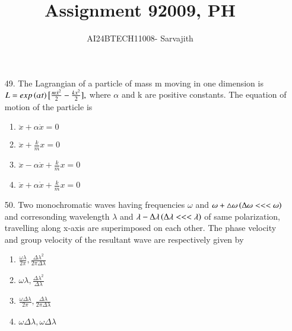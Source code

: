 \documentclass[journal]{IEEEtran}
\begin{document}

\vspace{3cm}


\author{AI24BTECH11008- Sarvajith
}
\title{Assignment 9}
{\let\newpage\relax\maketitle}
\title{2009, PH}
\renewcommand{\thefigure}{\theenumi}
\renewcommand{\thetable}{\theenumi}
\setlength{\intextsep}{10pt} %
\renewcommand{\thetable}{\theenumi}
\begin{enumerate}
    \item[49.] The Lagrangian of a particle of mass m moving in one dimension is $ L = exp\left(\alpha t\right)\big[\frac{m\dot{x}^2}{2}-\frac{kx^2}{2}],$ where $\alpha$ and k are positive constants. The equation of motion of the particle is 
     \begin{enumerate}[label=(\Alph*)]
        \item $\ddot{x}+\alpha \dot{x} = 0$
        \item $\ddot{x}+\frac{k}{m}x = 0$
        \item $\ddot{x}-\alpha \dot{x}+\frac{k}{m}x = 0$
        \item $\ddot{x}+\alpha \dot{x}+\frac{k}{m}x = 0$
     \end{enumerate}
     \item[50.] Two monochromatic waves having frequencies $\omega$ and $\omega + \triangle \omega \left(\Delta\omega<<<\omega\right)$ and corresonding wavelength $\lambda$ and $\lambda-\Delta\lambda\left(\Delta\lambda<<<\lambda\right)$ of same polarization, travelling along x-axis are superimposed on each other. The phase velocity and group velocity of the resultant wave are respectively given by
     \begin{enumerate}[label=(\Alph*)]
         \item $\frac{\omega\lambda}{2\pi},\frac{\Delta\lambda ^2}{2\pi\Delta\lambda}$
         \item $\omega\lambda,\frac{\Delta\lambda ^2}{\Delta\lambda}$
         \item $\frac{\omega\Delta\lambda}{2\pi},\frac{\Delta\lambda}{2\pi\Delta\lambda}$
         \item $\omega\Delta\lambda,\omega\Delta\lambda$

\end{enumerate}
\end{enumerate}
\end{document}
